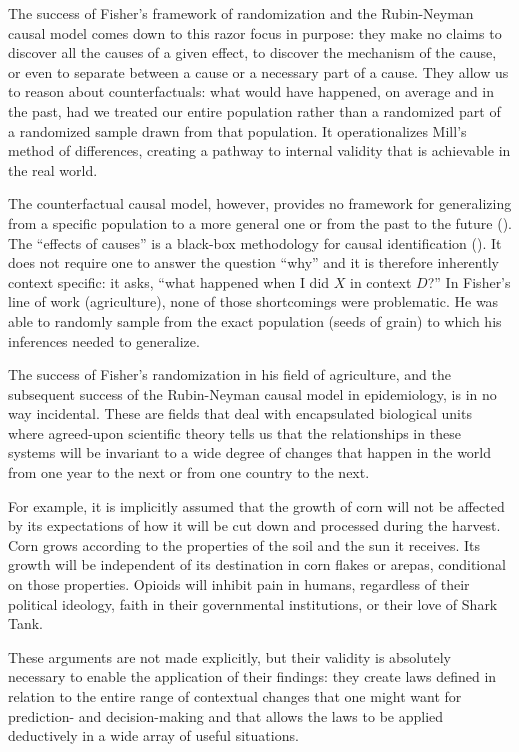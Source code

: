 \documentclass[a4paper,12pt]{article}
\begin{document}
The success of Fisher's framework of randomization and the Rubin-Neyman causal model comes down to this razor focus in purpose: they make no claims to discover all the causes of a given effect, to discover the mechanism of the cause, or even to separate between a cause or a necessary part of a cause. They allow us to reason about counterfactuals: what would have happened, on average and in the past, had we treated our entire population rather than a randomized part of a randomized sample drawn from that population. It operationalizes Mill's method of differences, creating a pathway to internal validity that is achievable in the real world.

The counterfactual causal model, however, provides no framework for generalizing from a specific population to a more general one or from the past to the future (\cite{Heckman2008}). The ``effects of causes'' is a black-box methodology for causal identification  (\cite{Heckman1995}). It does not require one to answer the question ``why'' and it is therefore inherently context specific: it asks, ``what happened when I did $X$ in context $D$?'' In Fisher's line of work (agriculture), none of those shortcomings were problematic. He was able to randomly sample from the exact population (seeds of grain) to which his inferences needed to generalize.

The success of Fisher's randomization in his field of agriculture, and the subsequent success of the Rubin-Neyman causal model in epidemiology, is in no way incidental. These are fields that deal with encapsulated biological units where agreed-upon scientific theory tells us that the relationships in these systems will be invariant to a wide degree of changes that happen in the world from one year to the next or from one country to the next.

For example, it is implicitly assumed that the growth of corn will not be affected by its expectations of how it will be cut down and processed during the harvest. Corn grows according to the properties of the soil and the sun it receives. Its growth will be independent of its destination in corn flakes or arepas, conditional on those properties. Opioids will inhibit pain in humans, regardless of their political ideology, faith in their governmental institutions, or their love of Shark Tank.

These arguments are not made explicitly, but their validity is absolutely necessary to enable the application of their findings: they create laws defined in relation to the entire range of contextual changes that one might want for prediction- and decision-making and that allows the laws to be applied deductively in a wide array of useful situations.
\end{document}

